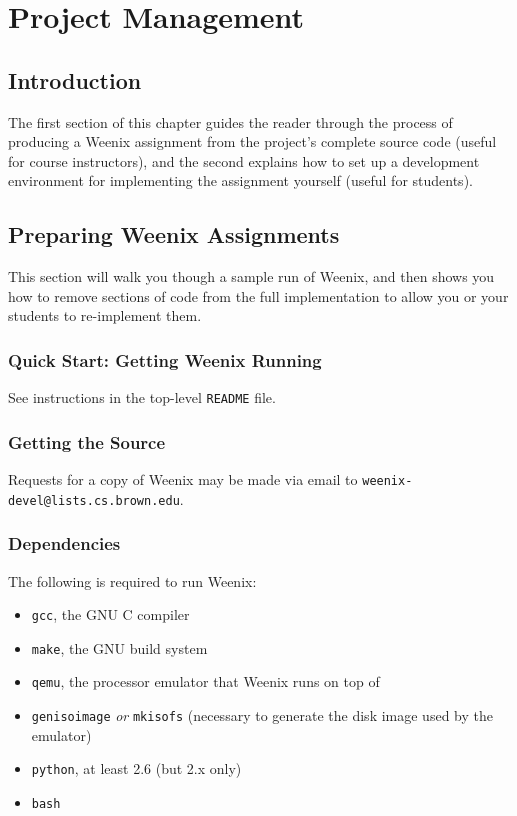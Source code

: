 \chapter{Project Management}
\label{project-management}

\section{Introduction}

The first section of this chapter guides the reader through the process of producing a Weenix assignment from the project's complete source code (useful for course instructors), and the second explains how to set up a development environment for implementing the assignment yourself (useful for students).

\section{Preparing Weenix Assignments}

This section will walk you though a sample run of Weenix, and then shows you how to remove sections of code from the full implementation to allow you or your students to re-implement them.

\subsection{Quick Start: Getting Weenix Running} \label{quickstart}

See instructions in the top-level \texttt{README} file.


\subsection{Getting the Source}
Requests for a copy of Weenix may be made via email to \texttt{weenix-devel@lists.cs.brown.edu}.
\subsection{Dependencies}
The following is required to run Weenix:

\begin{itemize}
\item \texttt{gcc}, the GNU C compiler %
\item \texttt{make}, the GNU build system
\item \texttt{qemu},%
the processor emulator that Weenix runs on top of
\item \texttt{genisoimage} \textit{or} \texttt{mkisofs} (necessary to generate the disk image used by the emulator)
\item \texttt{python}, at least 2.6 (but 2.x only)
\item \texttt{bash}
\end{itemize}

